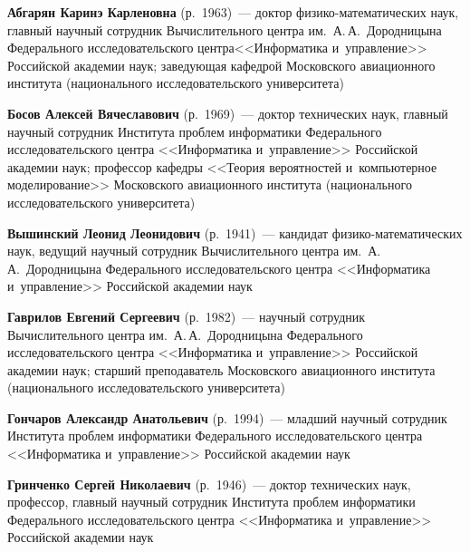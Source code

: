 \begin{multicols}{2}


\noindent
\textbf{Абгарян Каринэ Карленовна} (р.\ 1963)~--- доктор фи\-зи\-ко-ма\-те\-ма\-ти\-че\-ских наук, 
главный научный со\-труд\-ник Вы\-чис\-ли\-тель\-но\-го цент\-ра им.\ А.\,А.~Дородницына 
Федерального исследовательского цент\-ра\linebreak <<\mbox{Информатика} и~управ\-ле\-ние>> Российской академии наук; 
за\-ве\-ду\-ющая ка\-фед\-рой Московского авиационного института (национального исследовательского 
университета)




\noindent
\textbf{Босов Алексей Вячеславович} (р.\ 1969)~--- доктор технических наук, 
главный научный сотрудник Института проб\-лем информатики Федерального исследовательского центра 
<<Информатика и~управ\-ле\-ние>> Российской академии наук; профессор кафедры 
<<Тео\-рия вероятностей и~компьютерное моделирование>>
 Московского авиационного института (национального исследовательского университета)
 
 \noindent
\textbf{Вышинский Леонид Леонидович} (р.\ 1941)~--- 
кандидат фи\-зи\-ко-ма\-те\-ма\-ти\-че\-ских наук, ведущий научный со\-труд\-ник 
Вычислительного цент\-ра им.\ А.\,А.~Дородницына Федерального исследовательского цент\-ра 
<<Информатика и~управ\-ле\-ние>> Российской академии наук 

\vspace*{3pt}
 
 \noindent
\textbf{Гаврилов Евгений Сергеевич} (р.\ 1982)~--- 
научный со\-труд\-ник Вычислительного цент\-ра им.\ А.\,А.~Дородницына 
Федерального исследовательского цент\-ра <<Информатика и~управ\-ле\-ние>> Российской академии наук;
 старший преподаватель Московского авиационного института (национального исследовательского университета)
 


 
 \vspace*{2pt}
 
 \noindent
\textbf{Гончаров Александр Анатольевич} (р.\ 1994)~--- 
млад\-ший научный со\-труд\-ник Института проб\-лем информатики Федерального 
исследовательского цент\-ра <<Информатика и~управ\-ле\-ние>> \mbox{Российской} академии наук

\vspace*{2pt}

\noindent
\textbf{Гринченко Сергей Николаевич} (р.\ 1946)~--- доктор технических наук, профессор, 
главный научный со\-труд\-ник Института проб\-лем информатики Федерального исследовательского цент\-ра 
<<Информатика и~управ\-ле\-ние>> Российской академии наук


\end{multicols}
